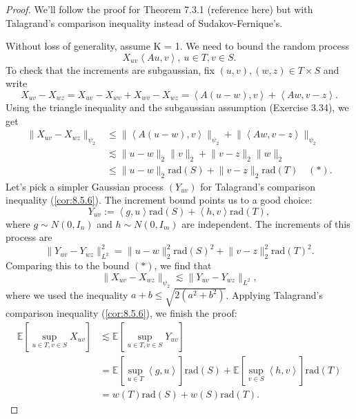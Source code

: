 \begin{proof}
We'll follow the proof for Theorem 7.3.1 (reference here) but with Talagrand's comparison inequality instead of 
Sudakov-Fernique's.

Without loss of generality, assume K = 1. We need to bound the random process 
\[ X_{uv}\left\langle Au, v \right\rangle, \ u \in T, v \in S. \]
To check that the increments are subgaussian, fix $(u, v), (w, z) \in T \times S$ and write 
\[ X_{uv} - X_{wz} = X_{uv} - X_{wv} + X_{wv} - X_{wz} = \left\langle A(u - w), v \right\rangle 
+ \left\langle Aw, v - z \right\rangle. \]
Using the triangle inequality and the subgaussian assumption (Exercise 3.34), we get 
\begin{align*}
	\lVert X_{uv} - X_{wz} \rVert_{\psi_2} 
	&\leq \lVert \left\langle A(u - w), v \right\rangle \rVert_{\psi_2} 
	+ \lVert \left\langle Aw, v - z \right\rangle \rVert_{\psi_2} \\
	&\lesssim \lVert u - w \rVert_{2}\lVert v \rVert_{2} + \lVert v - z \rVert_{2}\lVert w \rVert_{2} \\
	&\leq \lVert u - w \rVert_{2}\mathrm{rad}(S) + \lVert v - z \rVert_{2}\mathrm{rad}(T) \quad (*).
\end{align*}
Let's pick a simpler Gaussian process $(Y_{uv})$ for Talagrand's comparison inequality (\cref{cor:8.5.6}). The 
increment bound points us to a good choice:
\[ Y_{uv} := \left\langle g, u \right\rangle \mathrm{rad}(S) + \left\langle h, v \right\rangle 
\mathrm{rad}(T), \]
where $g \sim N(0, I_n)$ and $h \sim N(0, I_m)$ are independent. The increments of this process are 
\[ \lVert Y_{uv} - Y_{wz} \rVert_{L^2}^2 = \lVert u - w \rVert_{2}^2 \mathrm{rad}(S)^2 
+ \lVert v - z \rVert_{2}^2 \mathrm{rad}(T)^2. \]
Comparing this to the bound $(*)$, we find that 
\[ \lVert X_{uv} - X_{wz} \rVert_{\psi_2} \lesssim \lVert Y_{uv} - Y_{wz} \rVert_{L^2}, \]
where we used the inequality $a + b \leq \sqrt{2 (a^2 + b^2)}$. Applying Talagrand's comparison inequality 
(\cref{cor:8.5.6}), we finish the proof:
\begin{align*}
	\mathbb{E}\left[ \sup_{u \in T, v \in S}X_{uv} \right] 
	&\lesssim \mathbb{E}\left[ \sup_{u \in T, v \in S}Y_{uv} \right] \\
	&= \mathbb{E}\left[ \sup_{u \in T}\left\langle g, u \right\rangle \right] \mathrm{rad}(S) 
	+ \mathbb{E}\left[ \sup_{v \in S}\left\langle h, v \right\rangle \right] \mathrm{rad}(T) \\
	&= w(T) \mathrm{rad}(S) + w(S) \mathrm{rad}(T).
\end{align*}
\end{proof}

